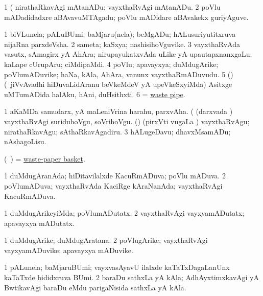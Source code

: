 \noindent 
\gl{\pagu}
\expl{}
\bmng
\bnum
\num{1}  (  nirathaRkavAgi mAtanADu; vayxthaRvAgi mAtanADu. 
\num{2}  poVlu mADadidadxre aBAvavuMTAgadu; poVlu mADidare aBAvakekx guriyAguve. 
\enum
\emng
\eentry

\bentry
{} 
\gl{\nA}
\expl{}
\bmng
\bnum
\num{1} biVLunela; pALuBUmi; baMjaru(nela); beMgADu; hALusuriyutitxruva nijaRna parxdeVsha. 
\num{2} sameta; kaSxya; nashisihoVguvike. 
\num{3} vayxthaRvAda vasutx, sAmagirx yA AhAra; nirupayukatxvAda uLike yA upautapxnanxgaLu; kaLape cUrupAru; ciMdipaMdi. 
\num{4} poVlu; apavayxya; duMdugArike; poVlumADuvike; haNa, kAla, AhAra, \mo vanunx vayxthaRmADuvudu. 
\num{5} (\nAyxshA) (\kanmu\ jiVvAvadhi hiDuvaLidAranu beVkeMdeV yA upeVkeSxyiMda) Asitxge uMTumADida halAku, hAni, duHsithxti. 
\num{6} = \hyperlink{waste pipe}{waste pipe}. 
\enum
\emng

\noindent 
\gl{\pagu}
\expl{}
\bmng
\bnum
\num{1}  aKaMDa samudarx, yA maLeniVrina harahu, parxvAha. 
  (  
\banum
{} (darxvada \vi) vayxthaRvAgi suriduhoVgu, soVrihoVgu. 
 (\rUpa) (pirxVti \mo vugaLa \vi) vayxthaRvAgu; nirathaRkavAgu; sAthaRkavAgadiru. 
\eanum
\numie
\num{3}  hALugeDavu; dhavxMsamADu; nAshagoLisu. 
\enum
\emng
\eentry

\bentry
{} 
\gl{\nA}
\expl{}
\bmng
(\kanmu\ \ame) = \hyperlink{waste-paper basket}{waste-paper basket}. 
\emng
\eentry

\bentry
{} 
\gl{\gu}
\expl{}
\bmng
\bnum
\num{1} duMdugAranAda; hiDitavilalxde KacuRmADuva; poVlu mADuva. 
\num{2} poVlumADuva; vayxthaRvAda KaciRge kAraNanAda; vayxthaRvAgi KacuRmADuva. 
\enum
\emng
\eentry

\bentry
{} 
\gl{\kirxvi}
\expl{}
\bmng
\bnum
\num{1} duMdugArikeyiMda; poVlumADutatx. 
\num{2} vayxthaRvAgi vayxyamADutatx; apavayxya mADutatx. 
\enum
\emng
\eentry

\bentry
{} 
\gl{\nA}
\expl{}
\bmng
\bnum
\num{1} duMdugArike; duMdugAratana. 
\num{2} poVlugArike; vayxthaRvAgi vayxyamADuvike; apavayxya mADuvike. 
\enum
\emng
\eentry

\bentry
{} 
\gl{\nA}
\expl{}
\bmng
\bnum
\num{1} pALunela; baMjaruBUmi; vayxvasAyavU ilalxde kaTaTxDagaLanUnx kaTaTxde bididxruva BUmi. 
\num{2} baraDu sathxLa yA kAla; AdhAyxtimxkavAgi yA BwtikavAgi baraDu eMdu parigaNisida sathxLa yA kAla. 
\enum
\emng
\eentry

